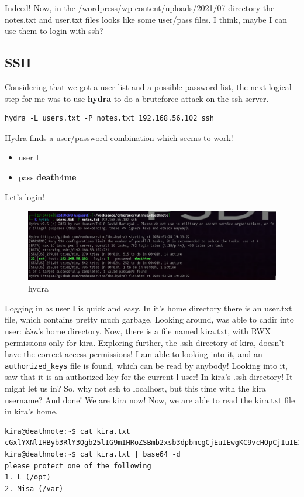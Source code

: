 \documentclass[a4paper,12pt]{article}
\begin{document}
Indeed! Now, in the /wordpress/wp-content/uploads/2021/07 directory the notes.txt and user.txt files looks like some user/pass files. 
I think, maybe I can use them to login with ssh?


\subsection*{SSH}
Considering that we got a user list and a possible password list, the next logical step for me was to use
\textbf{hydra} to do a bruteforce attack on the ssh server.
\begin{verbatim}
hydra -L users.txt -P notes.txt 192.168.56.102 ssh
\end{verbatim}
Hydra finds a user/password combination which seems to work! 
\begin{itemize}
\item{user} \textbf{l}
\item{pass} \textbf{death4me}
\end{itemize}
Let's login!
\begin{figure}[ht!]
	\includegraphics[width=\linewidth]{img/hydra.png}
	\caption{hydra}
	\label{fig:hydra}
\end{figure}


Logging in as user \textbf{l} is quick and easy. In it's home directory there is an user.txt file, which contains pretty much garbage.
Looking around, was able to chdir into user: \textit{kira}'s home directory.
Now, there is a file named kira.txt, with RWX permissions only for kira.
Exploring further, the .ssh directory of kira, doesn't have the correct access permissions!
I am able to looking into it, and an \verb|authorized_keys| file is found, which can be read by anybody! Looking into it, saw that it is an authorized key for the current l user! In kira's .ssh directory! It might let us in?
So, why not ssh to localhost, but this time with the kira username? And done!
We are kira now!
Now, we are able to read the kira.txt file in kira's home.

\scriptsize
\begin{verbatim}
kira@deathnote:~$ cat kira.txt 
cGxlYXNlIHByb3RlY3Qgb25lIG9mIHRoZSBmb2xsb3dpbmcgCjEuIEwgKC9vcHQpCjIuIE1pc2EgKC92YXIp
kira@deathnote:~$ cat kira.txt | base64 -d
please protect one of the following 
1. L (/opt)
2. Misa (/var)
\end{verbatim}
\normalsize
\end{document}
